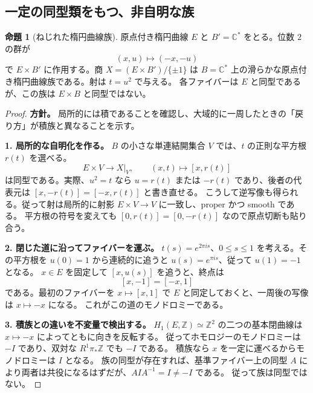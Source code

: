 \documentclass[dvipdfmx,a4paper,11pt]{article}
\theoremstyle{definition}
\newtheorem{prop}[thm]{命題}
\newcommand{\C}{\mathbb C}\newcommand{\R}{\mathbb R}\newcommand{\Z}{\mathbb Z}\newcommand{\Q}{\mathbb Q}
\begin{document}
\subsection{一定の同型類をもつ、非自明な族}
\begin{prop}[ねじれた楕円曲線族]\label{prop:twist}
原点付き楕円曲線 $E$ と $B'=\C^*$ をとる。位数 $2$ の群が
\[
(x,u)\longmapsto(-x,-u)
\]
で $E\times B'$ に作用する。商 $X=(E\times B')/\{\pm1\}$ は $B=\C^*$ 上の滑らかな原点付き楕円曲線族である。射は $t=u^2$ で与える。
各ファイバーは $E$ と同型であるが、この族は $E\times B$ と同型ではない。
\end{prop}
\begin{proof}
\textbf{方針。} 局所的には積であることを確認し、大域的に一周したときの「戻り方」が積族と異なることを示す。

\textbf{1. 局所的な自明化を作る。}
$B$ の小さな単連結開集合 $V$ では、$t$ の正則な平方根 $r(t)$ を選べる。
\[
E\times V\longrightarrow X|_V,\qquad (x,t)\longmapsto[x,r(t)]
\]
は同型である。実際、$u^2=t$ なら $u=r(t)$ または $-r(t)$ であり、後者の代表元は $[x,-r(t)]=[-x,r(t)]$ と書き直せる。
こうして逆写像も得られる。従って射は局所的に射影 $E\times V\to V$ に一致し、proper かつ smooth である。
平方根の符号を変えても $[0,r(t)]=[0,-r(t)]$ なので原点切断も貼り合う。

\textbf{2. 閉じた道に沿ってファイバーを運ぶ。}
$t(s)=e^{2\pi i s}$、$0\le s\le1$ を考える。その平方根を $u(0)=1$ から連続的に追うと $u(s)=e^{\pi i s}$、従って $u(1)=-1$ となる。
$x\in E$ を固定して $[x,u(s)]$ を追うと、終点は
\[
[x,-1]=[-x,1]
\]
である。最初のファイバーを $x\mapsto[x,1]$ で $E$ と同定しておくと、一周後の写像は $x\mapsto-x$ になる。
これがこの道のモノドロミーである。

\textbf{3. 積族との違いを不変量で検出する。}
$H_1(E,\Z)\simeq\Z^2$ の二つの基本閉曲線は $x\mapsto-x$ によってともに向きを反転する。
従ってホモロジーのモノドロミーは $-I$ であり、双対な $R^1\pi_*\Z$ でも $-I$ である。
積族なら $x$ を一定に運べるからモノドロミーは $I$ となる。
族の同型が存在すれば、基準ファイバー上の同型 $A$ により両者は共役になるはずだが、$AIA^{-1}=I\neq-I$ である。
従って族は同型ではない。
\end{proof}
\par\medskip
\noindent\begin{minipage}{\linewidth}
\begin{center}
\end{center}
\end{minipage}\par\medskip
\end{document}
